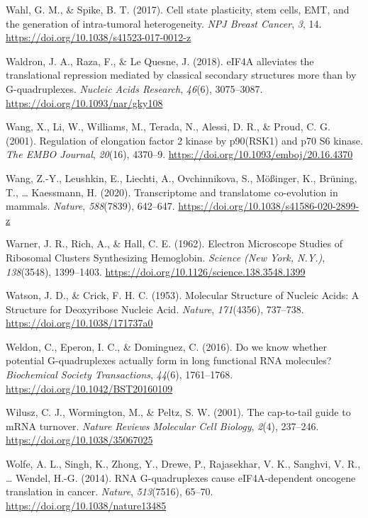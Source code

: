 \documentclass[12pt,openany]{book}
\begin{document}
\hypertarget{ref-Wahl2017}{}
Wahl, G. M., \& Spike, B. T. (2017). Cell state plasticity, stem cells,
EMT, and the generation of intra-tumoral heterogeneity. \emph{NPJ Breast
Cancer}, \emph{3}, 14. \url{https://doi.org/10.1038/s41523-017-0012-z}

\hypertarget{ref-Waldron2018}{}
Waldron, J. A., Raza, F., \& Le Quesne, J. (2018). eIF4A alleviates the
translational repression mediated by classical secondary structures more
than by G-quadruplexes. \emph{Nucleic Acids Research}, \emph{46}(6),
3075--3087. \url{https://doi.org/10.1093/nar/gky108}

\hypertarget{ref-Wang2001}{}
Wang, X., Li, W., Williams, M., Terada, N., Alessi, D. R., \& Proud, C.
G. (2001). Regulation of elongation factor 2 kinase by p90(RSK1) and p70
S6 kinase. \emph{The EMBO Journal}, \emph{20}(16), 4370--9.
\url{https://doi.org/10.1093/emboj/20.16.4370}

\hypertarget{ref-Wang2020}{}
Wang, Z.-Y., Leushkin, E., Liechti, A., Ovchinnikova, S., Mößinger, K.,
Brüning, T., \ldots{} Kaessmann, H. (2020). Transcriptome and
translatome co-evolution in mammals. \emph{Nature}, \emph{588}(7839),
642--647. \url{https://doi.org/10.1038/s41586-020-2899-z}

\hypertarget{ref-Warner1962}{}
Warner, J. R., Rich, A., \& Hall, C. E. (1962). Electron Microscope
Studies of Ribosomal Clusters Synthesizing Hemoglobin. \emph{Science
(New York, N.Y.)}, \emph{138}(3548), 1399--1403.
\url{https://doi.org/10.1126/science.138.3548.1399}

\hypertarget{ref-Watson1953}{}
Watson, J. D., \& Crick, F. H. C. (1953). Molecular Structure of Nucleic
Acids: A Structure for Deoxyribose Nucleic Acid. \emph{Nature},
\emph{171}(4356), 737--738. \url{https://doi.org/10.1038/171737a0}

\hypertarget{ref-Weldon2016}{}
Weldon, C., Eperon, I. C., \& Dominguez, C. (2016). Do we know whether
potential G-quadruplexes actually form in long functional RNA molecules?
\emph{Biochemical Society Transactions}, \emph{44}(6), 1761--1768.
\url{https://doi.org/10.1042/BST20160109}

\hypertarget{ref-Wilusz2001}{}
Wilusz, C. J., Wormington, M., \& Peltz, S. W. (2001). The cap-to-tail
guide to mRNA turnover. \emph{Nature Reviews Molecular Cell Biology},
\emph{2}(4), 237--246. \url{https://doi.org/10.1038/35067025}

\hypertarget{ref-Wolfe2014}{}
Wolfe, A. L., Singh, K., Zhong, Y., Drewe, P., Rajasekhar, V. K.,
Sanghvi, V. R., \ldots{} Wendel, H.-G. (2014). RNA G-quadruplexes cause
eIF4A-dependent oncogene translation in cancer. \emph{Nature},
\emph{513}(7516), 65--70. \url{https://doi.org/10.1038/nature13485}
\end{document}
